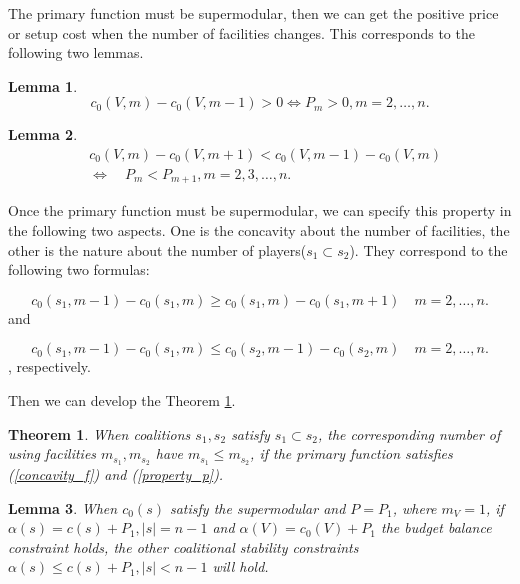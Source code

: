 \documentclass[UTF8]{article}
\newtheorem{thm}{\hspace{2em}Theorem}
\newtheorem{lem}{\hspace{2em}Lemma}
\begin{document}
The primary function must be supermodular, then we can get the positive price or setup cost when the number of facilities changes. This corresponds to the following two lemmas.


\begin{lem}\label{lem2}
\[c_0(V,m)- c_0(V,m-1) > 0 \Leftrightarrow P_m > 0, m=2,\ldots,n.\]

\end{lem}

\begin{lem}\label{lem3}
\[
\begin{aligned}
&c_0 (V,m) - c_0 (V,m+1) < c_0 (V,m-1) - c_0 (V,m) \\
&\Leftrightarrow \quad P_m < P_{m+1} , m=2,3,\ldots,n.
\end{aligned}
\]
\end{lem}

Once the primary function must be supermodular, we can specify this property in the following two aspects.
One is the concavity about the number of facilities,
the other is the nature about the number of players($s_1 \subset s_2$).
They correspond to the following two formulas:

\begin{equation}\label{concavity_f}
c_0(s_1,m-1)-c_0(s_1,m) \geq
  c_0(s_1,m)-c_0(s_1,m+1) \quad m=2,\ldots,n.
\end{equation}
and

\begin{equation}\label{property_p}
	c_0(s_1,m-1)-c_0(s_1,m) \leq
	  c_0(s_2,m-1)-c_0(s_2,m) \quad m=2,\ldots,n.
\end{equation}
, respectively.

Then we can develop the Theorem \ref{thm7}.

\begin{thm}\label{thm7}
When coalitions $s_1,s_2$ satisfy $s_1 \subset s_2$, the corresponding number of using facilities $ m_{s_1}, m_{s_2}$ have $m_{s_1} \leq m_{s_2}$, if the primary function satisfies  (\ref{concavity_f}) and (\ref{property_p}).
\end{thm}



\begin{lem}\label{lem4}
When $c_0(s)$ satisfy the supermodular and $P=P_1$, where $m_V=1$, if $\alpha(s)=c(s)+P_1, \left| s \right|= n-1$ and $\alpha(V)=c_0(V)+P_1$ the budget balance constraint holds, the other coalitional stability constraints $\alpha(s) \leq c(s)+P_1, \left| s \right| < n-1$ will hold.
\end{lem}
\end{document}
